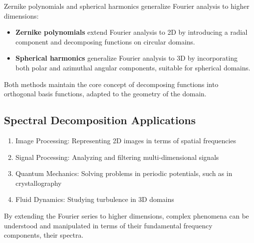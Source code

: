 Zernike polynomials and spherical harmonics generalize Fourier analysis to higher dimensions:
\begin{itemize}
    \item \textbf{Zernike polynomials} extend Fourier analysis to 2D by introducing a radial component and decomposing functions on circular domains.
    \item \textbf{Spherical harmonics} generalize Fourier analysis to 3D by incorporating both polar and azimuthal angular components, suitable for spherical domains.
\end{itemize}
Both methods maintain the core concept of decomposing functions into orthogonal basis functions, adapted to the geometry of the domain.
%
\subsection{Spectral Decomposition Applications}
\begin{enumerate}
\item Image Processing: Representing 2D images in terms of spatial frequencies
\item Signal Processing: Analyzing and filtering multi-dimensional signals
\item Quantum Mechanics: Solving problems in periodic potentials, such as in crystallography
\item Fluid Dynamics: Studying turbulence in 3D domains
\end{enumerate}

By extending the Fourier series to higher dimensions, complex phenomena can be understood and manipulated in terms of their fundamental frequency components, their spectra.


\endinput  %
